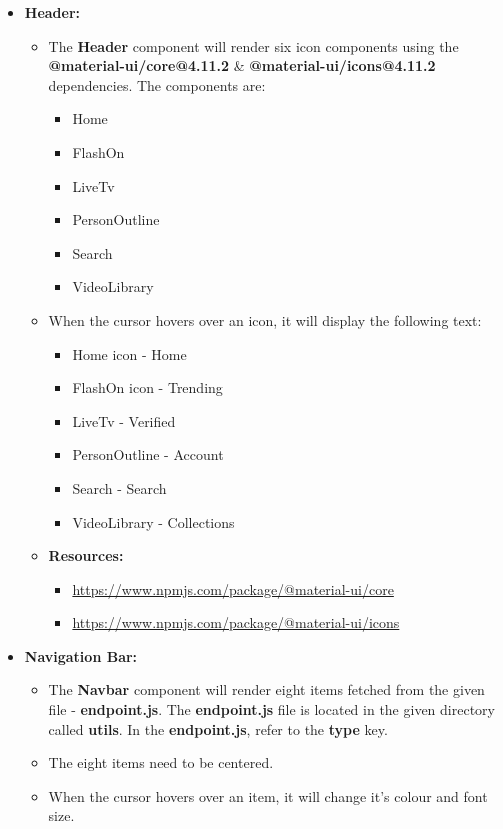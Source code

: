 \documentclass{article}
\begin{document}
\begin{itemize}
	\item \textbf{Header:}
	\begin{itemize}
		\item The \textbf{Header} component will render six icon components using the \textbf{@material-ui/core@4.11.2} \& \textbf{@material-ui/icons@4.11.2} dependencies. The components are:
		\begin{itemize}
			\item Home
			\item FlashOn
			\item LiveTv
			\item PersonOutline
			\item Search
			\item VideoLibrary
		\end{itemize} 
		\item When the cursor hovers over an icon, it will display the following text:
		\begin{itemize}
			\item Home icon - Home
			\item FlashOn icon - Trending
			\item LiveTv - Verified
			\item PersonOutline - Account
			\item Search - Search
			\item VideoLibrary - Collections
		\end{itemize}
		\item \textbf{Resources:} 
		\begin{itemize}
			\item \href{https://www.npmjs.com/package/@material-ui/core}{https://www.npmjs.com/package/@material-ui/core}
			\item \href{https://www.npmjs.com/package/@material-ui/icons}{https://www.npmjs.com/package/@material-ui/icons}
		\end{itemize}
	\end{itemize}
	\item \textbf{Navigation Bar:}
	\begin{itemize}
		\item The \textbf{Navbar} component will render eight items fetched from the given file - \textbf{endpoint.js}. The \textbf{endpoint.js} file is located in the given directory called \textbf{utils}. In the \textbf{endpoint.js}, refer to the \textbf{type} key.
		\item The eight items need to be centered.
		\item When the cursor hovers over an item, it will change it's colour and font size.

\end{itemize}
\end{itemize}
\end{document}
